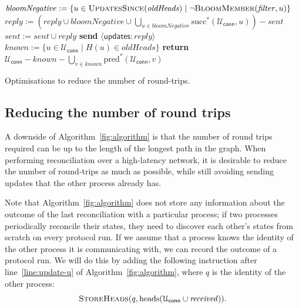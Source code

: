 \documentclass[a4paper,anonymous,USenglish]{lipics-v2019}
\begin{document}
\begin{algorithm}[t]
\begin{algorithmic}[1]
        \State $\mathit{bloomNegative} := \{u \in \Call{UpdatesSince}{\mathit{oldHeads}} \mid \neg\Call{BloomMember}{\mathit{filter}, u}\}$\label{line:bloom-member}
        \State $\mathit{reply} := \left(\mathit{reply} \cup \mathit{bloomNegative} \cup \bigcup_{u \in \mathit{bloomNegative}} \mathrm{succ}^*(\mathcal{U}_\mathsf{conn}, u)\right) - \mathit{sent}$\label{line:bloom-succ}
            \State $\mathit{sent} := \mathit{sent} \cup \mathit{reply}$
            \State \textbf{send} $\langle\mathsf{updates}: \mathit{reply}\rangle$ \label{line:a2-heads-reply}
        \EndIf
        \State {} \label{line:a2-heads-missing}
    \EndOn
    \State
        \State $\mathit{known} := \{u \in \mathcal{U}_\mathsf{conn} \mid H(u) \in \mathit{oldHeads}\}$
        \State \textbf{return} $\mathcal{U}_\mathsf{conn} - \mathit{known} - \bigcup_{v \in \mathit{known}} \mathrm{pred}^*(\mathcal{U}_\mathsf{conn}, v)$
    \EndFunction
    \end{algorithmic}
    \caption{Optimisations to reduce the number of round-trips.}\label{fig:algorithm2}
\end{algorithm}

\subsection{Reducing the number of round trips}\label{sec:algorithm2}

A downside of Algorithm~\ref{fig:algorithm} is that the number of round trips required can be up to the length of the longest path in the graph.
When performing reconciliation over a high-latency network, it is desirable to reduce the number of round-trips as much as possible, while still avoiding sending updates that the other process already has.

Note that Algorithm~\ref{fig:algorithm} does not store any information about the outcome of the last reconciliation with a particular process; if two processes periodically reconcile their states, they need to discover each other's states from scratch on every protocol run.
If we assume that a process knows the identity of the other process it is communicating with, we can record the outcome of a protocol run.
We will do this by adding the following instruction after line~\ref{line:update-u} of Algorithm~\ref{fig:algorithm}, where $q$ is the identity of the other process:
\[ \textsc{StoreHeads}(q, \mathrm{heads}(\mathcal{U}_\mathsf{conn} \cup \mathit{received})). \]
\end{document}
